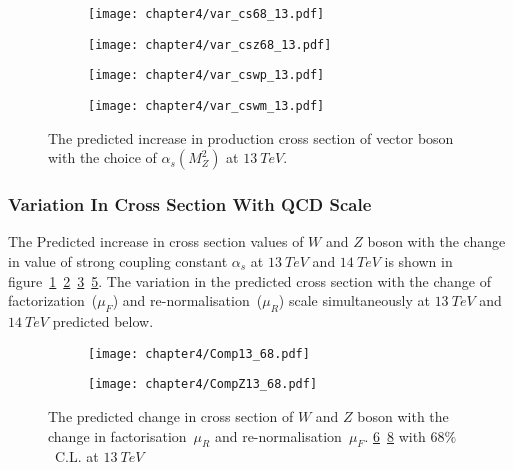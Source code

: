 \documentclass[a4paper,12pt]{report}
\numberwithin{equation}{section}
\begin{document}
\begin{figure}[H]\label{WZ13_14}
\centering
\begin{subfigure}{0.8\textwidth}
\texttt{[image: chapter4/var\_cs68\_13.pdf]}
\vspace*{-8mm}
\caption{}
\label{var_cs}
\end{subfigure}
\begin{subfigure}{0.8\textwidth}
\texttt{[image: chapter4/var\_csz68\_13.pdf]}
\vspace*{-8mm}
\caption{}
\label{var_cs1}
\end{subfigure}
\begin{subfigure}{0.8\textwidth}
\texttt{[image: chapter4/var\_cswp\_13.pdf]}
\vspace*{-8mm}
\caption{}
\label{var_cs2}
\end{subfigure}
\begin{subfigure}{0.8\textwidth}
\texttt{[image: chapter4/var\_cswm\_13.pdf]}
\vspace*{-8mm}
\caption{}
\label{var_cs3}
\end{subfigure}
\caption{The predicted increase in production cross section of vector boson with the choice of $\alpha_{s}(M_{Z}^{2})$ at $13~TeV$.} 
\end{figure}
\subsubsection{Variation In Cross Section With QCD Scale}
The Predicted increase in cross section values of $W$ and $Z$ boson with the change in value of strong coupling constant $\alpha_{s}$ at $13~TeV$ and $14~TeV$ is shown in figure~\ref{var_cs}~\ref{var_cs1}~\ref{var_cs2}~\ref{var_cs3}. The variation in the predicted cross section with the change of factorization~($\mu_{F}$) and re-normalisation~($\mu_{R}$) scale simultaneously at $13~TeV$ and $14~TeV$ predicted below.\\


\begin{figure}[H]
\centering
\begin{subfigure}{0.8\textwidth}
\texttt{[image: chapter4/Comp13\_68.pdf]}
\vspace*{-8mm}
\caption{}
\label{rfw}
\end{subfigure}
\begin{subfigure}{0.8\textwidth}
\texttt{[image: chapter4/CompZ13\_68.pdf]}
\vspace*{-8mm}
\caption{}
\label{rfz}
\end{subfigure}
\caption{The predicted change in cross section of $W$ and $Z$ boson with the change in factorisation~$\mu_{R}$ and re-normalisation~$\mu_{F}$. \ref{rfw}~\ref{rfz} with $68\%$~C.L. at $13~TeV$ } 
\end{figure}
\end{document}
